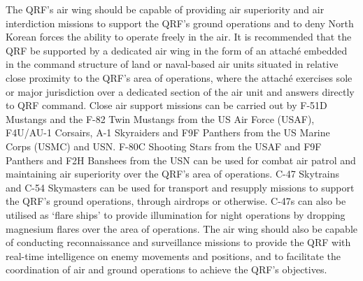 \documentclass[a4paper,12pt]{article}
\begin{document}
{	The QRF's air wing should be capable of providing air superiority and air interdiction missions to support the QRF's ground operations and to deny North Korean forces the ability to operate freely in the air. It is recommended that the QRF be supported by a dedicated air wing in the form of an attaché embedded in the command structure of land or naval-based air units situated in relative close proximity to the QRF's area of operations, where the attaché exercises sole or major jurisdiction over a dedicated section of the air unit and answers directly to QRF command. Close air support missions can be carried out by F-51D Mustangs and the F-82 Twin Mustangs from the US Air Force (USAF), F4U/AU-1 Corsairs, A-1 Skyraiders and F9F Panthers from the US Marine Corps (USMC) and USN. F-80C Shooting Stars from the USAF and F9F Panthers and F2H Banshees from the USN can be used for combat air patrol and maintaining air superiority over the QRF's area of operations. C-47 Skytrains and C-54 Skymasters can be used for transport and resupply missions to support the QRF's ground operations, through airdrops or otherwise. C-47s can also be utilised as `flare ships' to provide illumination for night operations by dropping magnesium flares over the area of operations. The air wing should also be capable of conducting reconnaissance and surveillance missions to provide the QRF with real-time intelligence on enemy movements and positions, and to facilitate the coordination of air and ground operations to achieve the QRF's objectives.
}

\clearpage
\end{document}
